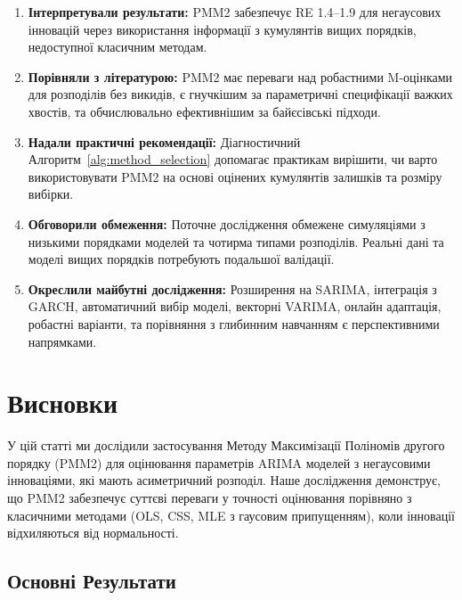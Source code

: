 \documentclass[12pt,a4paper]{article}
\begin{document}
	\begin{enumerate}
		\item \textbf{Інтерпретували результати:} PMM2 забезпечує RE 1.4--1.9 для негаусових інновацій через використання інформації з кумулянтів вищих порядків, недоступної класичним методам.
		
		\item \textbf{Порівняли з літературою:} PMM2 має переваги над робастними M-оцінками для розподілів без викидів, є гнучкішим за параметричні специфікації важких хвостів, та обчислювально ефективнішим за байєсівські підходи.
		
		\item \textbf{Надали практичні рекомендації:} Діагностичний Алгоритм~\ref{alg:method_selection} допомагає практикам вирішити, чи варто використовувати PMM2 на основі оцінених кумулянтів залишків та розміру вибірки.
		
		\item \textbf{Обговорили обмеження:} Поточне дослідження обмежене симуляціями з низькими порядками моделей та чотирма типами розподілів. Реальні дані та моделі вищих порядків потребують подальшої валідації.
		
		\item \textbf{Окреслили майбутні дослідження:} Розширення на SARIMA, інтеграція з GARCH, автоматичний вибір моделі, векторні VARIMA, онлайн адаптація, робастні варіанти, та порівняння з глибинним навчанням є перспективними напрямками.
	\end{enumerate}
	
	
	\section{Висновки}
	\label{sec:conclusion}
	
	У цій статті ми дослідили застосування Методу Максимізації Поліномів другого порядку (PMM2) для оцінювання параметрів ARIMA моделей з негаусовими інноваціями, які мають асиметричний розподіл. Наше дослідження демонструє, що PMM2 забезпечує суттєві переваги у точності оцінювання порівняно з класичними методами (OLS, CSS, MLE з гаусовим припущенням), коли інновації відхиляються від нормальності.
	
	\subsection{Основні Результати}
	\label{subsec:main_findings}
	
\end{document}
